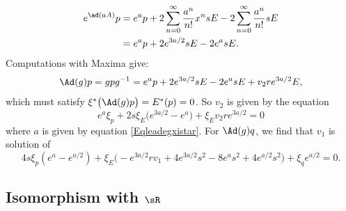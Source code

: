 \[
	\begin{split}
		e^{\ad(aA)}p&= e^{a}p+2\sum_{n=0}^{\infty}\frac{ a^{n} }{ n! }x^{n}sE-2\sum_{n=0}^{\infty}\frac{ a^{n} }{ n! }sE\\
		&= e^{a}p+2 e^{3a/2}sE-2 e^{a}sE.
	\end{split}
\]
Computations with Maxima give:
\[
	\begin{split}
		\Ad(g)p=gpg^{-1}= e^{a}p+2 e^{3a/2}sE-2 e^{a}sE+v_2r e^{3a/2}E,
	\end{split}
\]
which must satisfy $\xi^*\big( \Ad(g)p \big)=E^*(p)=0$. So $v_2$ is given by the equation
\begin{equation}
	e^{a}\xi_{p}+2s\xi_{E}\big(  e^{3a/2}- e^{a} \big)+\xi_{E}v_2r e^{3a/2}=0
\end{equation}
where $a$ is given by equation \eqref{Eqleadegxistar}. For $\Ad(g)q$, we find that $v_1$ is solution of
\begin{equation}
	4s\xi_{p}( e^{a}- e^{a/2})+\xi_{E}\big( - e^{3a/2}rv_1+4 e^{3a/2}s^{2}-8 e^{a}s^{2}+4 e^{a/2}s^{2} \big)+\xi_{q} e^{a/2}=0.
\end{equation}

\subsection{Isomorphism with \texorpdfstring{$\sR$}{R}}

